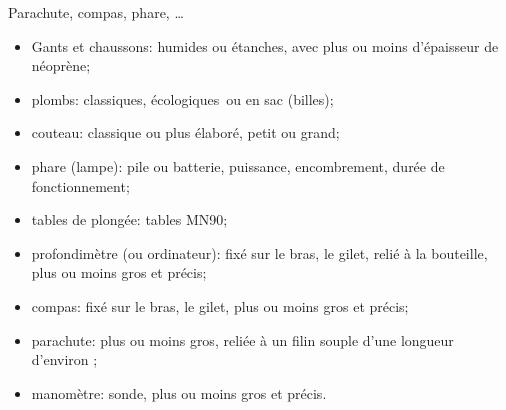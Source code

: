 \begin{frame}{Parachute, compas, phare, \dots}
\begin{itemize}[<+->]
\item Gants et chaussons: humides ou étanches, avec plus ou moins d'épaisseur
  de néoprène;
\item plombs: classiques, \og écologiques\fg\ ou en sac (billes);
\item couteau: classique ou plus élaboré, petit ou grand;
\item phare (lampe): pile ou batterie, puissance, encombrement, durée de fonctionnement;
\item tables de plongée: tables MN90;
\item profondimètre (ou ordinateur): fixé sur le bras, le gilet, relié à la
  bouteille, plus ou moins gros et précis;
\item compas: fixé sur le bras, le gilet, plus ou moins gros et précis;
\item parachute: plus ou moins gros, reliée à un filin souple d'une longueur
  d'environ ;
\item manomètre: sonde, plus ou moins gros et précis.
\end{itemize}
\end{frame}
